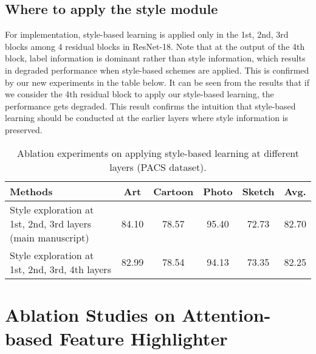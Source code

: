 \documentclass{article}
\theoremstyle{plain}
\theoremstyle{definition}
\theoremstyle{remark}
\begin{document}
\subsection{Where to apply the style module}

For implementation, style-based learning is applied only in the 1st, 2nd, 3rd blocks among 4 residual blocks in ResNet-18. Note that at the output of the 4th block, label information is dominant rather than style information, which results in degraded performance when style-based schemes are applied. This is confirmed by our new experiments in the table below. It can be seen from the results that if we consider the 4th residual block to apply our style-based learning, the performance gets degraded. This result confirms the intuition that style-based learning should be conducted at the earlier layers where style information is preserved.


\begin{table}[!h]
\small
\centering
	\begin{tabular}{l|    cccc | c}
		\toprule  
		Methods   &Art  & Cartoon & Photo & Sketch & Avg. \\ 
		\midrule		
		Style exploration at 1st, 2nd, 3rd layers (main manuscript)  &84.10 &78.57 &95.40&72.73&82.70\\
	   	Style exploration at 1st, 2nd, 3rd, 4th layers  & 82.99 &78.54 &94.13 &73.35&  82.25\\
		\bottomrule
	\end{tabular}
\vspace{+3mm}
\caption{Ablation experiments on applying style-based learning at different layers (PACS dataset).} 
\label{table:ablationdifl}
\end{table}






\section{Ablation Studies on Attention-based Feature Highlighter}
\end{document}
